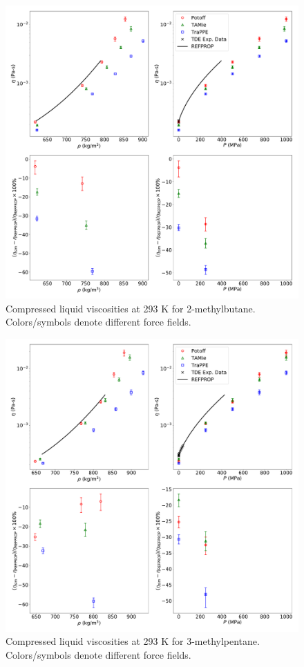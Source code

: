 \documentclass[preprint,review,12pt]{elsarticle}
\begin{document}
	\begin{figure}[htb!]
		\centering
		\includegraphics[width=6.4in]{compare_REFPROP_T293highP_IC5H12.pdf}
		\caption{Compressed liquid viscosities at 293 K for 2-methylbutane. Colors/symbols denote different force fields.}
		\label{fig:T293highP_IC5}
	\end{figure} 
	
	\begin{figure}[htb!]
		\centering
		\includegraphics[width=6.4in]{compare_REFPROP_T293highP_3MPentane.pdf}
		\caption{Compressed liquid viscosities at 293 K for 3-methylpentane. Colors/symbols denote different force fields.}
		\label{fig:T293highP_3MP}
	\end{figure} 
	
\end{document}
